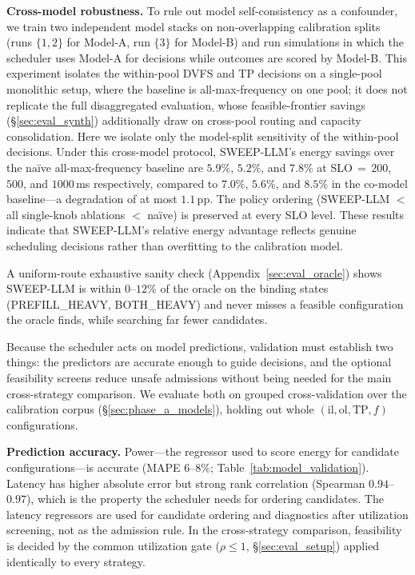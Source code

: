 \textbf{Cross-model robustness.} To rule out model self-consistency as a confounder, we train two independent model stacks on non-overlapping calibration splits (runs $\{1,2\}$ for Model-A, run $\{3\}$ for Model-B) and run simulations in which the scheduler uses Model-A for decisions while outcomes are scored by Model-B.
This experiment isolates the within-pool DVFS and TP decisions on a single-pool monolithic setup, where the baseline is all-max-frequency on one pool; it does not replicate the full disaggregated evaluation, whose feasible-frontier savings (\S\ref{sec:eval_synth}) additionally draw on cross-pool routing and capacity consolidation. Here we isolate only the model-split sensitivity of the within-pool decisions.
Under this cross-model protocol, SWEEP-LLM's energy savings over the na\"ive all-max-frequency baseline are $5.9\%$, $5.2\%$, and $7.8\%$ at SLO$\,{=}\,200$, $500$, and $1000$\,ms respectively, compared to $7.0\%$, $5.6\%$, and $8.5\%$ in the co-model baseline---a degradation of at most $1.1$\,pp. The policy ordering (SWEEP-LLM $<$ all single-knob ablations $<$ na\"ive) is preserved at every SLO level. These results indicate that SWEEP-LLM's relative energy advantage reflects genuine scheduling decisions rather than overfitting to the calibration model.

A uniform-route exhaustive sanity check (Appendix~\ref{sec:eval_oracle}) shows SWEEP-LLM is within $0$--$12\%$ of the oracle on the binding states (PREFILL\_HEAVY, BOTH\_HEAVY) and never misses a feasible configuration the oracle finds, while searching far fewer candidates.
\fi

Because the scheduler acts on model predictions, validation must establish two things: the predictors are accurate enough to guide decisions, and the optional feasibility screens reduce unsafe admissions without being needed for the main cross-strategy comparison.
We evaluate both on grouped cross-validation over the calibration corpus (\S\ref{sec:phase_a_models}), holding out whole $(\mathrm{il},\mathrm{ol},\mathrm{TP},f)$ configurations.

\textbf{Prediction accuracy.}
Power---the regressor used to score energy for candidate configurations---is accurate (MAPE $6$--$8\%$; Table~\ref{tab:model_validation}).
Latency has higher absolute error but strong rank correlation (Spearman $0.94$--$0.97$), which is the property the scheduler needs for ordering candidates.
The latency regressors are used for candidate ordering and diagnostics after utilization screening, not as the admission rule.
In the cross-strategy comparison, feasibility is decided by the common utilization gate ($\rho\le1$, \S\ref{sec:eval_setup}) applied identically to every strategy.

